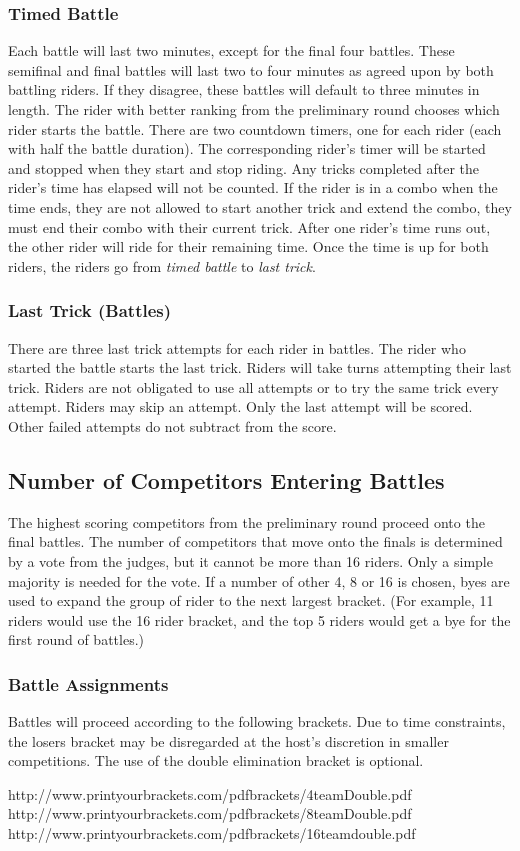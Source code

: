 \subsubsection{Timed Battle}
Each battle will last two minutes, except for the final four battles.
These semifinal and final battles will last two to four minutes as agreed upon by both battling riders.
If they disagree, these battles will default to three minutes in length.
The rider with better ranking from the preliminary round chooses which rider starts the battle.
There are two countdown timers, one for each rider (each with half the battle duration).
The corresponding rider's timer will be started and stopped when they start and stop riding.
Any tricks completed after the rider's time has elapsed will not be counted.
If the rider is in a combo when the time ends, they are not allowed to start another trick and extend the combo, they must end their combo with their current trick.
After one rider's time runs out, the other rider will ride for their remaining time.
Once the time is up for both riders, the riders go from \textit{timed battle} to \textit{last trick}.

\subsubsection{Last Trick (Battles)}
There are three last trick attempts for each rider in battles.
The rider who started the battle starts the last trick.
Riders will take turns attempting their last trick.
Riders are not obligated to use all attempts or to try the same trick every attempt.
Riders may skip an attempt.
Only the last attempt will be scored.
Other failed attempts do not subtract from the score.

\subsection{Number of Competitors Entering Battles}
The highest scoring competitors from the preliminary round proceed onto the final battles.
The number of competitors that move onto the finals is determined by a vote from the judges, but it cannot be more than 16 riders.
Only a simple majority is needed for the vote.
If a number of other 4, 8 or 16 is chosen, byes are used to expand the group of rider to the next largest bracket.
(For example, 11 riders would use the 16 rider bracket, and the top 5 riders would get a bye for the first round of battles.)

\subsubsection{Battle Assignments}
Battles will proceed according to the following brackets.
Due to time constraints, the losers bracket may be disregarded at the host's discretion in smaller competitions.
The use of the double elimination bracket is optional.

http://www.printyourbrackets.com/pdfbrackets/4teamDouble.pdf \\
http://www.printyourbrackets.com/pdfbrackets/8teamDouble.pdf \\
http://www.printyourbrackets.com/pdfbrackets/16teamdouble.pdf
